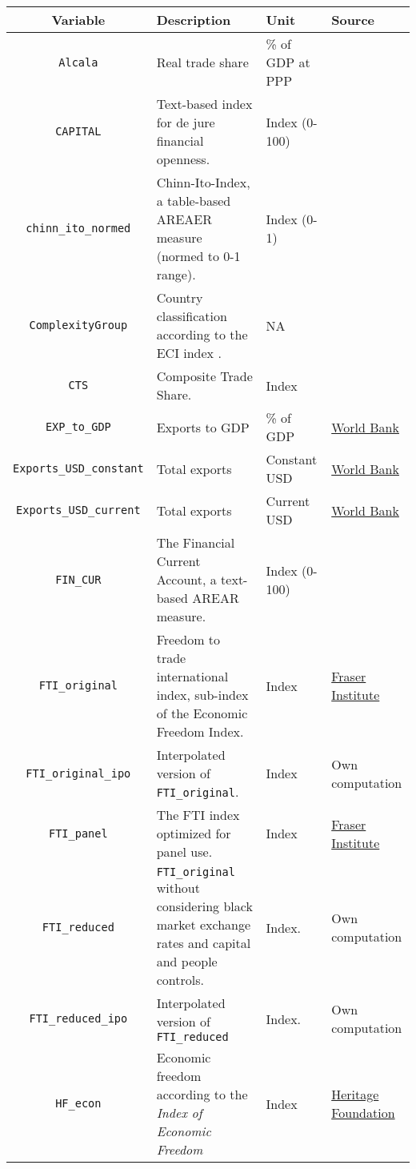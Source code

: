 \documentclass[
	a4paper,
	11pt,
	bibtotoc,
	headings=standardclasses,
  	headings=big]{scrartcl}
\newcommand{\code}[1]{\colorbox{gray!20}{\texttt{#1}}}
\begin{document}
\begin{longtable}{cL{5cm}L{2cm}L{2.75cm}}
\toprule
	\textbf{Variable} & \textbf{Description} & \textbf{Unit} & \textbf{Source}\\
\midrule[0.75pt]
\endhead
\code{Alcala} & Real trade share & \% of GDP at PPP & \citet{Alcala.2004} \\
\code{CAPITAL} & Text-based index for de jure financial openness. & Index (0-100) & \citet{Quinn.2008fb4}\\
\code{chinn\_ito\_normed} & Chinn-Ito-Index, a table-based AREAER measure (normed to 0-1 range). & Index (0-1)& \citet{Chinn.2008}\\
\code{ComplexityGroup} & Country classification according to the ECI index \citep[][see the paper for details]{Hidalgo.2009}. & NA & \citet{openness} \\
\code{CTS} & Composite Trade Share. & Index & \citet{Squalli.2011}\\
\code{EXP\_to\_GDP} & Exports to GDP & \% of GDP & \href{https://data.worldbank.org/indicator/NE.TRD.GNFS.ZS}{World Bank}\\
\code{Exports\_USD\_constant} & Total exports & Constant USD & \href{https://data.worldbank.org/indicator/NE.EXP.GNFS.KD}{World Bank} \\
\code{Exports\_USD\_current} & Total exports & Current USD & \href{https://data.worldbank.org/indicator/NE.EXP.GNFS.CD}{World Bank}\\
%
\code{FIN\_CUR} & The Financial Current Account, a text-based AREAR measure. & Index (0-100) & \citet{Quinn.2008fb4} \\
\code{FTI\_original} & Freedom to trade international index, sub-index of the Economic Freedom Index. & Index & \href{https://www.fraserinstitute.org/economic-freedom/dataset}{Fraser Institute}\\
\code{FTI\_original\_ipo} & Interpolated version of \code{FTI\_original}. & Index & Own computation\\
\code{FTI\_panel} & The FTI index optimized for panel use. & Index & \href{https://www.fraserinstitute.org/economic-freedom/dataset}{Fraser Institute} \\
\code{FTI\_reduced} & \code{FTI\_original} without considering black market exchange rates and capital and people controls. & Index. & Own computation \\
\code{FTI\_reduced\_ipo} & Interpolated version of \code{FTI\_reduced} & Index. & Own computation \\
\code{HF\_econ} & Economic freedom according to the \textit{Index of Economic Freedom} & Index & \href{https://www.heritage.org/index/explore}{Heritage Foundation}\\

\end{longtable}
\end{document}
